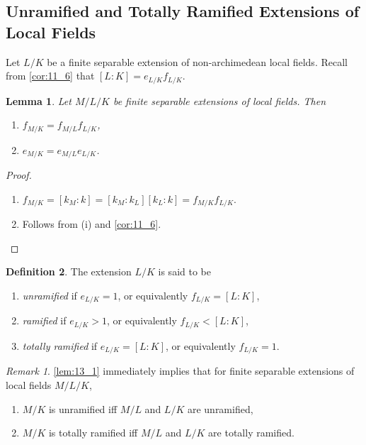 \documentclass[11pt]{article}
\theoremstyle{definition}
\newtheorem{definition}{Definition}[subsection]
\theoremstyle{plain}
\newtheorem{lemma}[definition]{Lemma}
\theoremstyle{remark}
\newtheorem*{remark}{Remark}
\begin{document}
\subsection{Unramified and Totally Ramified Extensions of Local Fields}

Let $L/K$ be a finite separable extension of non-archimedean local fields.
Recall from \autoref{cor:11_6} that $[L : K] = e_{L/K} f_{L/K}$.

\begin{lemma}\label{lem:13_1}
    Let $M/L/K$ be finite separable extensions of local fields. Then
    \begin{enumerate}
        \item $f_{M/K} = f_{M/L} f_{L/K}$,
        \item $e_{M/K} = e_{M/L} e_{L/K}$.
    \end{enumerate}
\end{lemma}
\begin{proof}
    \begin{enumerate}
        \item $f_{M/K} = [k_M : k] = [k_M : k_L] [k_L : k] = f_{M/K} f_{L/K}$.
        \item Follows from (i) and \autoref{cor:11_6}. \qedhere
    \end{enumerate}
\end{proof}

\begin{definition}
    The extension $L/K$ is said to be
    \begin{enumerate}
        \item \emph{unramified} if $e_{L/K} = 1$, or equivalently $f_{L/K} = [L : K]$,
        \item \emph{ramified} if $e_{L/K} > 1$, or equivalently $f_{L/K} < [L : K]$,
        \item \emph{totally ramified} if $e_{L/K} = [L : K]$, or equivalently $f_{L/K} = 1$.
    \end{enumerate}
\end{definition}

\begin{remark}
    \autoref{lem:13_1} immediately implies that for finite separable extensions of local fields $M/L/K$,
    \begin{enumerate}
        \item $M/K$ is unramified iff $M/L$ and $L/K$ are unramified,
        \item $M/K$ is totally ramified iff $M/L$ and $L/K$ are totally ramified.
    \end{enumerate}
\end{remark}
\end{document}
